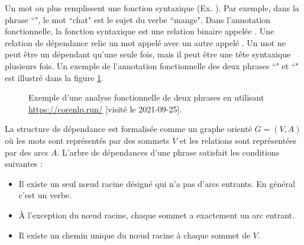 \documentclass{KodeBook}
\begin{document}
Un mot ou plus remplissent une fonction syntaxique (Ex. ).
Par exemple, dans la phrase ``", le mot ``chat" est le sujet du verbe ``mange". 
Dans l'annotation fonctionnelle, la fonction syntaxique est une relation binaire appelée .
Une relation de dépendance relie un mot appelé  avec un autre appelé . 
Un mot ne peut être un dépendant qu'une seule fois, mais il peut être une tête syntaxique plusieurs fois. 
Un exemple de l'annotation fonctionnelle des deux phrases ``" et ``" est illustré dans la figure \ref{fig:parse-fct-exp}.
%
\begin{figure}[ht]
	\centering
	\caption[Exemple d'une analyse fonctionnelle de deux phrases.]{Exemple d'une analyse fonctionnelle de deux phrases en utilisant \url{https://corenlp.run/} [visité le 2021-09-25].}
	\label{fig:parse-fct-exp}
\end{figure}

La structure de dépendance est formalisée comme un graphe orienté $G=(V, A)$ où les mots sont représentés par des sommets $V$ et les relations sont représentées par des arcs $A$. 
L'arbre de dépendances d'une phrase satisfait les conditions suivantes : 
\begin{itemize}
	\item Il existe un seul nœud racine désigné qui n'a pas d'arcs entrants. En général c'est un verbe.
	\item À l'exception du nœud racine, chaque sommet a exactement un arc entrant.
	\item Il existe un chemin unique du nœud racine à chaque sommet de $V$.
\end{itemize}
\end{document}
